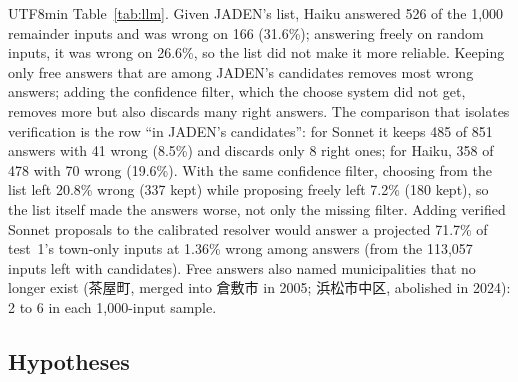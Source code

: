 \documentclass[10pt]{article}
\begin{document}
\begin{CJK}{UTF8}{min}
Table~\ref{tab:llm}. Given JADEN's list, Haiku answered 526 of the 1,000 remainder inputs and was wrong on
166 (31.6\%); answering freely on random inputs, it was wrong on 26.6\%, so the list did not make it more
reliable. Keeping only free answers that are among JADEN's candidates removes most wrong answers; adding
the confidence filter, which the choose system did not get, removes more but also discards many right
answers. The comparison that isolates verification is the row ``in JADEN's candidates'': for Sonnet it keeps 485 of 851 answers with 41 wrong (8.5\%) and discards only 8 right
ones; for Haiku, 358 of 478 with 70 wrong (19.6\%). With the same confidence filter, choosing from the list
left 20.8\% wrong (337 kept) while proposing freely left 7.2\% (180 kept), so the list itself made the
answers worse, not only the missing filter. Adding verified Sonnet proposals to the calibrated resolver
would answer a projected 71.7\% of test~1's town-only inputs at 1.36\% wrong among answers (from the
113,057 inputs left with candidates).
Free answers also named municipalities that no longer exist (茶屋町, merged into 倉敷市 in 2005;
浜松市中区, abolished in 2024): 2 to 6 in each 1,000-input sample.

\subsection{Hypotheses}


\end{CJK}
\end{document}
